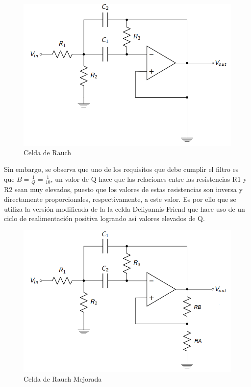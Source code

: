 \begin{figure}[H]
    \centering
    \includegraphics[scale = 0.6]{../Ejercicio2-DisenoDeCeldas/2CELDARAUCH/Informe/circuito3.png}
    \caption{Celda de Rauch}
    \label{ej22cirbasic}
\end{figure}

Sin embargo, se observa que uno de los requisitos que debe cumplir el filtro es que $B = \frac{1}{Q} = \frac{1}{10}$, un valor de Q hace que las relaciones entre las resistencias R1 y R2 sean muy elevados, puesto que los valores de estas resistencias son inversa y directamente proporcionales, respectivamente, a este valor. Es por ello que se utiliza la versión modificada de la la celda Deliyannis-Friend que hace uso de un ciclo de realimentación positiva logrando asi valores elevados de Q.

\begin{figure}[H]
    \centering
    \includegraphics[scale = 0.6]{../Ejercicio2-DisenoDeCeldas/2CELDARAUCH/Informe/circuito.png}
    \caption{Celda de Rauch Mejorada}
    \label{ej22cirbasic}
\end{figure}


